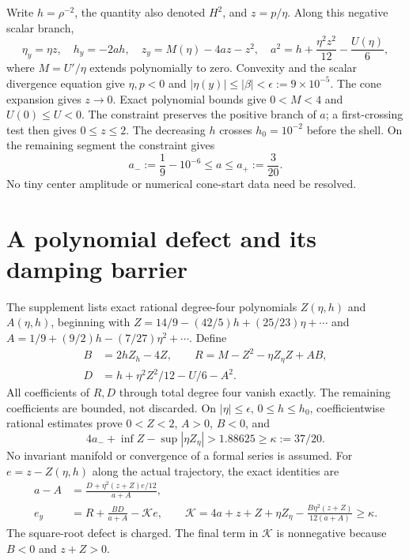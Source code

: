 \documentclass[11pt]{article}
\begin{document}
Write $h=\rho^{-2}$, the quantity also denoted $H^2$, and $z=p/\eta$.
Along this negative scalar branch,
\begin{equation}
 \eta_y=\eta z,\quad h_y=-2ah,\quad z_y=M(\eta)-4az-z^2,\quad
 a^2=h+\frac{\eta^2z^2}{12}-\frac{U(\eta)}6,\label{eq:flow}
\end{equation}
where $M=U'/\eta$ extends polynomially to zero. Convexity and the scalar
divergence equation give $\eta,p<0$ and
$|\eta(y)|\leq|\beta|<\epsilon:=9\times10^{-5}$.
The cone expansion gives $z\to0$. Exact polynomial bounds give $0<M<4$
and $U(0)\leq U<0$. The constraint preserves the positive branch of $a$;
a first-crossing test then gives $0\leq z\leq2$. The decreasing $h$ crosses
$h_0=10^{-2}$ before the shell. On the remaining segment the constraint gives
\begin{equation}
 a_-:=\frac19-10^{-6}\leq a\leq a_+:=\frac3{20}.\label{eq:abox}
\end{equation}
No tiny center amplitude or numerical cone-start data need be resolved.

\section{A polynomial defect and its damping barrier}
The supplement lists exact rational degree-four polynomials $Z(\eta,h)$ and
$A(\eta,h)$, beginning with $Z=14/9-(42/5)h+(25/23)\eta+\cdots$ and
$A=1/9+(9/2)h-(7/27)\eta^2+\cdots$. Define
\begin{align}
 B&=2hZ_h-4Z,\qquad R=M-Z^2-\eta Z_\eta Z+AB,\nonumber\\
 D&=h+\eta^2Z^2/12-U/6-A^2.\label{eq:defects}
\end{align}
All coefficients of $R,D$ through total degree four vanish exactly. The
remaining coefficients are bounded, not discarded. On
$|\eta|\leq\epsilon$, $0\leq h\leq h_0$, coefficientwise rational estimates
prove $0<Z<2$, $A>0$, $B<0$, and
\begin{equation}
 4a_-+\inf Z-\sup|\eta Z_\eta|>1.88625\geq\kappa:=37/20.
 \label{eq:damping}
\end{equation}
No invariant manifold or convergence of a formal series is assumed.
For $e=z-Z(\eta,h)$ along the actual trajectory, the exact identities are
\begin{align}
 a-A&=\frac{D+\eta^2(z+Z)e/12}{a+A},\nonumber\\
 e_y&=R+\frac{BD}{a+A}-\mathcal K e,\qquad
 \mathcal K=4a+z+Z+\eta Z_\eta
       -\frac{B\eta^2(z+Z)}{12(a+A)}\geq\kappa.\label{eq:error}
\end{align}
The square-root defect is charged. The final term in $\mathcal K$ is
nonnegative because $B<0$ and $z+Z>0$.
\end{document}
